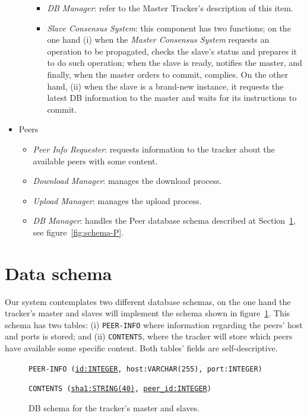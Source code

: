 \documentclass[twoside,a4paper,10pt]{article}
\begin{document}
\begin{itemize}
\begin{itemize}
    \begin{itemize}
    \item \emph{DB Manager}: refer to the Master Tracker's description of this
      item.
    \item \emph{Slave Consensus System}: this component has two functions; on
      the one hand
      (i) when the \emph{Master Consensus System} requests an operation to be
      propagated, checks the slave's status and prepares it to do such
      operation; when the slave is ready, notifies the master, and finally, when
      the master orders to commit, complies. On the other hand, (ii) when the
      slave is a brand-new instance, it requests the latest DB information to
      the master and waits for its instructions to commit.
    \end{itemize}
  \end{itemize}
\item Peers
  \begin{itemize}
  \item \emph{Peer Info Requester}: requests information to the tracker about
    the available peers with some content.
  \item \emph{Download Manager}: manages the download process.
  \item \emph{Upload Manager}: manages the upload process.
  \item \emph{DB Manager}: handles the Peer database schema described at
    Section~\ref{sec:data-schema}, see figure~\ref{fig:schema-P}.
  \end{itemize}
\end{itemize}


\section{Data schema}\label{sec:data-schema}

Our system contemplates two different database schemas, on the one hand the
tracker's master and slaves will implement the schema shown in
figure~\ref{fig:schema-MS}. This schema has two tables: (i) \texttt{PEER-INFO}
where information regarding the peers' host and ports is stored; and (ii)
\texttt{CONTENTS}, where the tracker will store which peers have available some
specific content. Both tables' fields are self-descriptive.

\begin{figure}[h]
  
  \texttt{PEER-INFO (\underline{id:INTEGER}, host:VARCHAR(255), port:INTEGER)}
  
  \texttt{CONTENTS (\underline{sha1:STRING(40)}, \underline{peer\_id:INTEGER})}
  
  \centering
  \caption{\label{fig:schema-MS}DB schema for the tracker's master and slaves.}
\end{figure}
\end{document}
